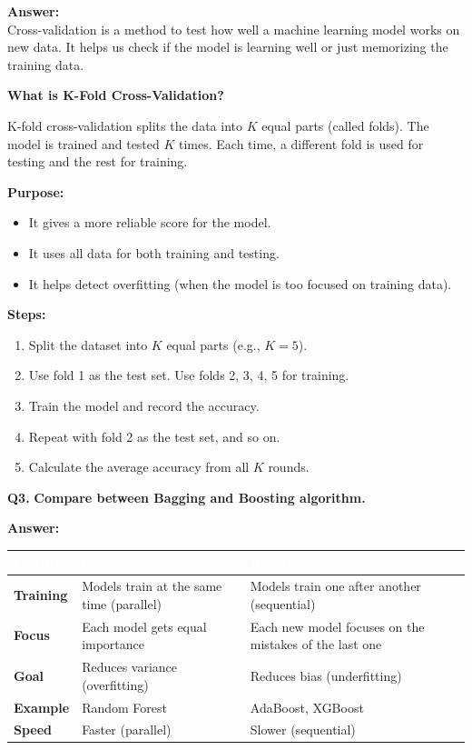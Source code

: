 \documentclass[12pt,a4paper]{article}
\newcommand{\question}[2]{%
    \begin{mdframed}[style=questionstyle]
        \textbf{\textcolor{headerblue}{Q#1.}} \textbf{#2}
    \end{mdframed}%
    \vspace{2pt}%
}
\newcommand{\ans}{\textbf{\textcolor{headerblue}{Answer:}}\\[4pt]}
\newcommand{\subhead}[1]{\textbf{\textcolor{headerblue}{#1}}}
\begin{document}
\ans

Cross-validation is a method to test how well a machine learning model works on new data. It helps us check if the model is learning well or just memorizing the training data.

\subhead{What is K-Fold Cross-Validation?}

K-fold cross-validation splits the data into $K$ equal parts (called folds). The model is trained and tested $K$ times. Each time, a different fold is used for testing and the rest for training.

\subhead{Purpose:}
\begin{itemize}[leftmargin=*]
    \item It gives a more reliable score for the model.
    \item It uses all data for both training and testing.
    \item It helps detect overfitting (when the model is too focused on training data).
\end{itemize}

\subhead{Steps:}
\begin{enumerate}[leftmargin=*]
    \item Split the dataset into $K$ equal parts (e.g., $K = 5$).
    \item Use fold 1 as the test set. Use folds 2, 3, 4, 5 for training.
    \item Train the model and record the accuracy.
    \item Repeat with fold 2 as the test set, and so on.
    \item Calculate the average accuracy from all $K$ rounds.
\end{enumerate}

\vspace{10pt}
\question{3}{Compare between Bagging and Boosting algorithm.}

\ans

\begin{tabularx}{\textwidth}{|>{\bfseries}l|L|L|}
\hline
{}\textcolor{white}{\textbf{Feature}} & \textcolor{white}{\textbf{Bagging}} & \textcolor{white}{\textbf{Boosting}} \\
\hline
Training & Models train at the same time (parallel) & Models train one after another (sequential) \\
\hline
Focus & Each model gets equal importance & Each new model focuses on the mistakes of the last one \\
\hline
Goal & Reduces variance (overfitting) & Reduces bias (underfitting) \\
\hline
Example & Random Forest & AdaBoost, XGBoost \\
\hline
Speed & Faster (parallel) & Slower (sequential) \\
\hline
\end{tabularx}
\end{document}
